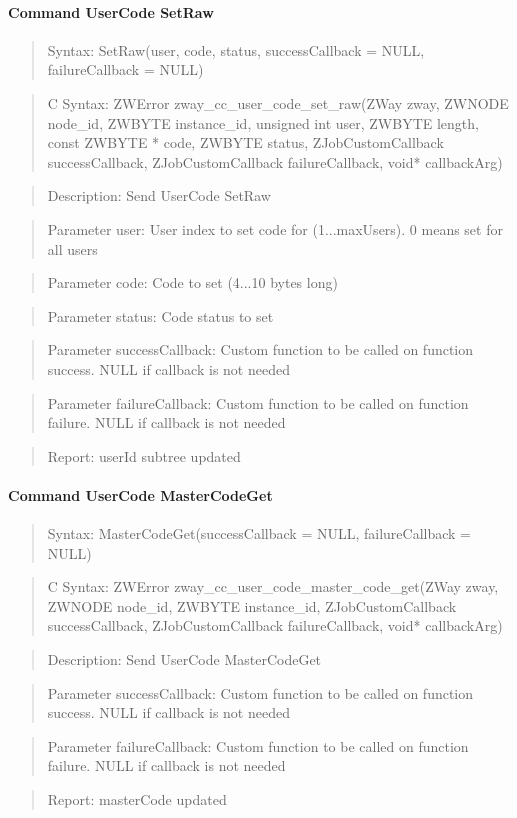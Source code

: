 \paragraph{Command UserCode SetRaw}
\begin{quote}Syntax: SetRaw(user, code, status, successCallback = NULL, failureCallback = NULL)\end{quote}
\begin{quote}C Syntax: ZWError zway\_cc\_user\_code\_set\_raw(ZWay zway, ZWNODE node\_id, ZWBYTE instance\_id, unsigned int user, ZWBYTE length, const ZWBYTE * code, ZWBYTE status, ZJobCustomCallback successCallback, ZJobCustomCallback failureCallback, void* callbackArg)\end{quote}
\begin{quote}Description: Send UserCode SetRaw\end{quote}
\begin{quote}Parameter user: User index to set code for (1...maxUsers). 0 means set for all users\end{quote}
\begin{quote}Parameter code: Code to set (4...10 bytes long)\end{quote}
\begin{quote}Parameter status: Code status to set\end{quote}
\begin{quote}Parameter successCallback: Custom function to be called on function success. NULL if callback is not needed\end{quote}
\begin{quote}Parameter failureCallback: Custom function to be called on function failure. NULL if callback is not needed\end{quote}
\begin{quote}Report: userId subtree updated\end{quote}

\paragraph{Command UserCode MasterCodeGet}
\begin{quote}Syntax: MasterCodeGet(successCallback = NULL, failureCallback = NULL)\end{quote}
\begin{quote}C Syntax: ZWError zway\_cc\_user\_code\_master\_code\_get(ZWay zway, ZWNODE node\_id, ZWBYTE instance\_id, ZJobCustomCallback successCallback, ZJobCustomCallback failureCallback, void* callbackArg)\end{quote}
\begin{quote}Description: Send UserCode MasterCodeGet\end{quote}
\begin{quote}Parameter successCallback: Custom function to be called on function success. NULL if callback is not needed\end{quote}
\begin{quote}Parameter failureCallback: Custom function to be called on function failure. NULL if callback is not needed\end{quote}
\begin{quote}Report: masterCode updated\end{quote}

